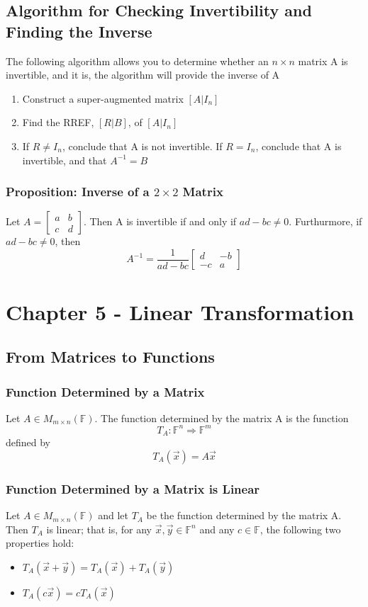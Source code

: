 \documentclass[12pt, letterpaper]{article}
\begin{document}
\subsection{Algorithm for Checking Invertibility and Finding the Inverse}
The following algorithm allows you to determine whether an $n\times n$ matrix A is invertible, and it is, 
the algorithm will provide the inverse of A 
\begin{enumerate}
    \item Construct a super-augmented matrix $[A|I_n]$
    \item Find the RREF, $[R|B]$, of $[A|I_n]$
    \item If $R\neq I_n$, conclude that A is not invertible. If $R = I_n$, conclude that A is invertible, and that $A^{-1} = B$
\end{enumerate}
\subsubsection{Proposition: Inverse of a $2\times 2$ Matrix}
Let $A = \begin{bmatrix}
    a &b \\ c &d
\end{bmatrix}$. Then A is invertible if and only if $ad-bc\neq 0$. Furthurmore, if $ad - bc\neq 0$, then 
\[A^{-1} = \frac{1}{ad-bc}\begin{bmatrix}
    d &-b \\ -c &a
\end{bmatrix}\]

\section{Chapter 5 - Linear Transformation}
\subsection{From Matrices to Functions}
\subsubsection{Function Determined by a Matrix}
Let $A\in M_{m\times n}(\mathbb{F})$. The function determined by the matrix A is the function \[T_A: \mathbb{F}^n \Rightarrow \mathbb{F}^m\]
defined by \[T_A(\vec{x}) = A\vec{x}\]
\subsubsection{Function Determined by a Matrix is Linear}
Let $A\in M_{m\times n}(\mathbb{F})$ and let $T_A$ be the function determined by the matrix A. Then $T_A$ is linear; that is, 
for any $\vec{x}, \vec{y}\in\mathbb{F}^n$ and any $c\in\mathbb{F}$, the following two properties hold: 
\begin{itemize}
    \item $T_A(\vec{x} + \vec{y}) = T_A(\vec{x}) + T_A(\vec{y})$
    \item $T_A(c\vec{x}) = cT_A(\vec{x})$
\end{itemize}
\end{document}
